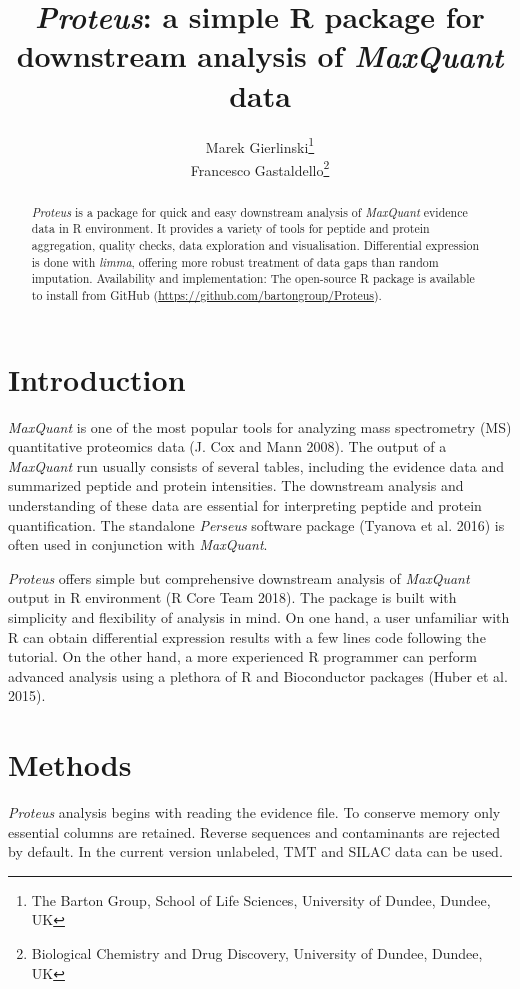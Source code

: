 \documentclass[]{article}
\title{\emph{Proteus}: a simple R package for downstream analysis of
\emph{MaxQuant} data}
\author{Marek Gierlinski\footnote{The Barton Group, School of Life Sciences,
  University of Dundee, Dundee, UK} \\ Francesco Gastaldello\footnote{Biological Chemistry and Drug Discovery,
  University of Dundee, Dundee, UK}}
\date{}
\begin{document}
\maketitle
\begin{abstract}
\emph{Proteus} is a package for quick and easy downstream analysis of
\emph{MaxQuant} evidence data in R environment. It provides a variety of
tools for peptide and protein aggregation, quality checks, data
exploration and visualisation. Differential expression is done with
\emph{limma}, offering more robust treatment of data gaps than random
imputation. Availability and implementation: The open-source R package
is available to install from GitHub
(\url{https://github.com/bartongroup/Proteus}).
\end{abstract}

\section{Introduction}\label{introduction}

\emph{MaxQuant} is one of the most popular tools for analyzing mass
spectrometry (MS) quantitative proteomics data (J. Cox and Mann 2008).
The output of a \emph{MaxQuant} run usually consists of several tables,
including the evidence data and summarized peptide and protein
intensities. The downstream analysis and understanding of these data are
essential for interpreting peptide and protein quantification. The
standalone \emph{Perseus} software package (Tyanova et al. 2016) is
often used in conjunction with \emph{MaxQuant}.

\emph{Proteus} offers simple but comprehensive downstream analysis of
\emph{MaxQuant} output in R environment (R Core Team 2018). The package
is built with simplicity and flexibility of analysis in mind. On one
hand, a user unfamiliar with R can obtain differential expression
results with a few lines code following the tutorial. On the other hand,
a more experienced R programmer can perform advanced analysis using a
plethora of R and Bioconductor packages (Huber et al. 2015).

\section{Methods}\label{methods}

\emph{Proteus} analysis begins with reading the evidence file. To
conserve memory only essential columns are retained. Reverse sequences
and contaminants are rejected by default. In the current version
unlabeled, TMT and SILAC data can be used.
\end{document}
